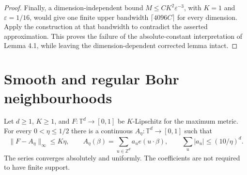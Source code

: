 \begin{proof}
Finally, a dimension-independent bound $M\leq C K^2\varepsilon^{-3}$,
with $K=1$ and $\varepsilon=1/16$, would give one finite upper bandwidth
$\lceil4096C\rceil$ for every dimension.  Apply the construction at that
bandwidth to contradict the asserted approximation.  This proves the
failure of the absolute-constant interpretation of Lemma 4.1, while
leaving the dimension-dependent corrected lemma intact.
\end{proof}

\section{Smooth and regular Bohr neighbourhoods}

\begin{lemma}
\label{app:compact-smoothing}
\leanok
{}
Let $d\geq1$, $K\geq1$, and $F:\mathbb T^d\to[0,1]$ be $K$-Lipschitz
for the maximum metric.  For every $0<\eta\leq1/2$ there is a continuous
$A_\eta:\mathbb T^d\to[0,1]$ such that
\[
 \|F-A_\eta\|_\infty\leq K\eta,\qquad
 A_\eta(\beta)=\sum_{u\in\mathbb Z^d}a_u e(u\cdot\beta),\qquad
 \sum_u|a_u|\leq(10/\eta)^d.
\]
The series converges absolutely and uniformly.  The coefficients are not
required to have finite support.
\end{lemma}
